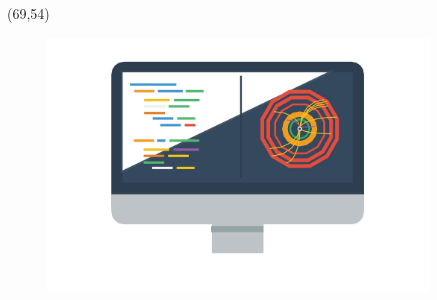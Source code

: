 \documentclass[final]{beamer}
\begin{document}
\begin{frame}{}
\begin{textblock}{12.5}(69,54)
\begin{figure}[tbph]
\centering
\includegraphics[width=0.9\textwidth]{images/better-software.jpg}
\end{figure}
\end{textblock}









\end{frame}
\end{document}
